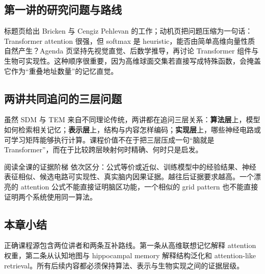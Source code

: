 \subsection{第一讲的研究问题与路线}

标题页给出 Bricken 与 Cengiz Pehlevan 的工作；动机页把问题压缩为一句话：Transformer attention 很强，但 softmax 是 heuristic，能否由简单高维向量性质自然产生？Agenda 页坚持先视觉直觉、后数学推导，再讨论 Transformer 组件与生物可实现性。这种顺序很重要，因为高维球面交集若直接写成特殊函数，会掩盖它作为“重叠地址数量”的记忆直觉。





\subsection{两讲共同追问的三层问题}

虽然 SDM 与 TEM 来自不同理论传统，两讲都在追问三层关系：\textbf{算法层}上，模型如何检索相关记忆；\textbf{表示层}上，结构与内容怎样编码；\textbf{实现层}上，哪些神经电路或可学习矩阵能够执行计算。课程价值不在于把三层压成一句“脑就是 Transformer”，而在于比较跨层映射何时精确、何时只是启发。

\begin{importantbox}{阅读全课的证据阶梯}
依次区分：公式等价或近似、训练模型中的经验结果、神经表征相似、候选电路可实现性、真实脑内因果证据。越往后证据要求越高。一个漂亮的 attention 公式不能直接证明脑区功能，一个相似的 grid pattern 也不能直接证明两个系统使用同一算法。
\end{importantbox}

\subsection{本章小结}

正确课程源包含两位讲者和两条互补路线。第一条从高维联想记忆解释 attention 权重，第二条从认知地图与 hippocampal memory 解释结构泛化和 attention-like retrieval。所有后续内容都必须保持算法、表示与生物实现之间的证据层级。

